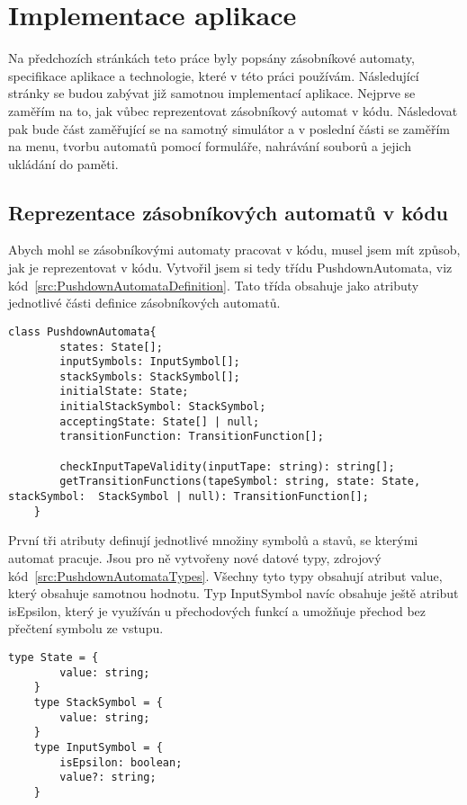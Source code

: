 \chapter{Implementace aplikace}

Na předchozích stránkách teto práce byly popsány zásobníkové automaty, specifikace aplikace a technologie, které v této práci používám. Následující stránky se budou zabývat již samotnou implementací aplikace. Nejprve se zaměřím na to, jak vůbec reprezentovat zásobníkový automat v kódu. Následovat pak bude část zaměřující se na samotný simulátor a v poslední části se zaměřím na menu, tvorbu automatů pomocí formuláře, nahrávání souborů a jejich ukládání do paměti.

\section{Reprezentace zásobníkových automatů v kódu}

Abych mohl se zásobníkovými automaty pracovat v kódu, musel jsem mít způsob, jak je reprezentovat v kódu. Vytvořil jsem si tedy třídu PushdownAutomata, viz kód~\ref{src:PushdownAutomataDefinition}. Tato třída obsahuje jako atributy jednotlivé části definice zásobníkových automatů. 

\begin{lstlisting}[label=src:PushdownAutomataDefinition, caption={Deklarce třídy PushdownAutomata}]
    class PushdownAutomata{
        states: State[];
        inputSymbols: InputSymbol[];
        stackSymbols: StackSymbol[];
        initialState: State;
        initialStackSymbol: StackSymbol;
        acceptingState: State[] | null;
        transitionFunction: TransitionFunction[];
    
        checkInputTapeValidity(inputTape: string): string[];
        getTransitionFunctions(tapeSymbol: string, state: State, stackSymbol:  StackSymbol | null): TransitionFunction[];
    }
\end{lstlisting}

První tři atributy definují jednotlivé množiny symbolů a stavů, se kterými automat pracuje. Jsou pro ně vytvořeny nové datové typy, zdrojový kód~\ref{src:PushdownAutomataTypes}. Všechny tyto typy obsahují atribut value, který obsahuje samotnou hodnotu. Typ InputSymbol navíc obsahuje ještě atribut isEpsilon, který je využíván u přechodových funkcí a umožňuje přechod bez přečtení symbolu ze vstupu.

\begin{lstlisting}[label=src:PushdownAutomataTypes, caption={Datové typ State, StackSymbol, InputSymbol}]
    type State = {
        value: string;
    }
    type StackSymbol = {
        value: string;
    }
    type InputSymbol = {
        isEpsilon: boolean;
        value?: string;
    }
\end{lstlisting}


